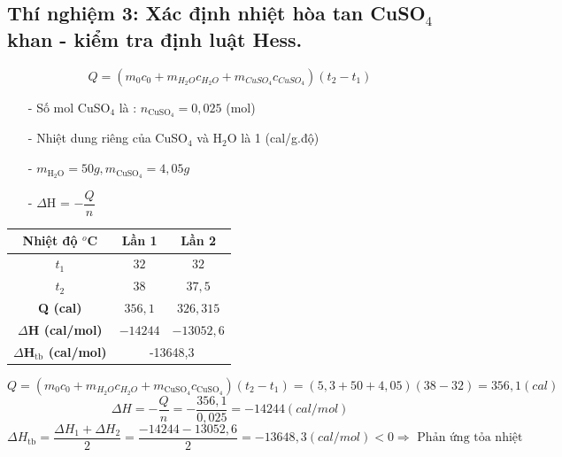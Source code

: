 \documentclass[12pt,a4paper]{report}
\begin{document}
\subsection*{Thí nghiệm 3: Xác định nhiệt hòa tan CuSO$_4$ khan - kiểm tra định luật Hess.}
\[
    Q = (m_0c_0 + m_{H_2O}c_{H_2O} + m_{CuSO_4}c_{CuSO_4})(t_2 - t_1)
\]
\begin{itemize}
    \item[-] Số mol CuSO$_4$ là : $n_\text{CuSO$_4$} = 0,025$ (mol)
    \item[-] Nhiệt dung riêng của CuSO$_4$ và H$_2$O là 1 (cal/g.độ)
    \item[-] $m_\text{H$_2$O} = 50g, m_\text{CuSO$_4$} = 4,05g$
    \item[-] $\Delta$H = $-\dfrac{Q}{n}$
\end{itemize}
\begin{table}[h!]
\centering
\begin{tabular}{|c|cc|}
\hline
\textbf{Nhiệt độ $^o$C}                  & \multicolumn{1}{c|}{\textbf{Lần 1}} & \textbf{Lần 2} \\ \hline
\textbf{$t_1$}                           & \multicolumn{1}{c|}{$32$}           & $32$           \\ \hline
\textbf{$t_2$}                           & \multicolumn{1}{c|}{$38$}           & $37,5$         \\ \hline
\textbf{Q (cal)}                         & \multicolumn{1}{c|}{$356,1$}        & $326,315$      \\ \hline
\textbf{$\Delta$H (cal/mol)}             & \multicolumn{1}{c|}{$-14244$}       & $-13052,6$     \\ \hline
\textbf{$\Delta$H$_\text{tb}$ (cal/mol)} & \multicolumn{2}{c|}{-13648,3}                         \\ \hline
\end{tabular}
\end{table}
\[
    Q = (m_0c_0 + m_{H_2O}c_{H_2O} + m_\text{CuSO$_4$}c_\text{CuSO$_4$})(t_2 - t_1) = (5,3 +50 + 4,05)(38-32)= 356,1 (cal)
\]
\[
    \Delta H = - \frac{Q}{n} = - \frac{356,1}{0,025} = -14244 (cal/mol) 
\]
\[
    \Delta H_\text{tb} = \frac{\Delta H_1 + \Delta H_2}{2} = \frac{-14244 - 13052,6}{2} = -13648,3 (cal/mol)< 0 \Rightarrow \text{ Phản ứng tỏa nhiệt}    
\]
\end{document}

